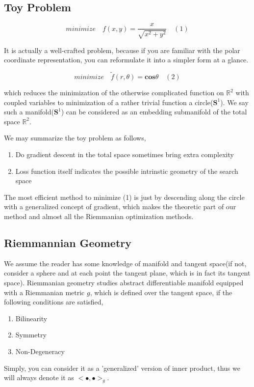 \documentclass[letterpaper]{article}
\begin{document}
\subsection{Toy Problem}
$$
  minimize \quad f(x,y) = \frac{x}{\sqrt{x^2+y^2}} \quad (1)
$$

It is actually a well-crafted problem, because if you are familiar with the polar coordinate representation, you can reformulate
it into a simpler form at a glance.

$$
  minimize \quad \tilde{f}(r,\theta)=\mathbf{cos}\theta \quad (2)
$$

which reduces the minimization of the otherwise complicated function on $\mathbb{R}^2$ with coupled variables to minimization of a rather trivial
function a circle($\mathbf{S}^1$). We say such a manifold($\mathbf{S}^1$) can be considered as an embedding submanifold of
the total space $\mathbb{R}^2$.

We may summarize the toy problem as follows,
\begin{enumerate}
  \item Do gradient descent in the total space sometimes bring extra complexity
  \item Loss function itself indicates the possible intrinstic geometry of the search space
\end{enumerate}

The most efficient method to minimize (1) is just by descending along the circle with a generalized concept of gradient, which makes the theoretic part of our method and almost all the Riemmanian
optimization methods.

\subsection{Riemmannian Geometry}
We assume the reader has some knowledge of manifold and tangent space(if not, consider a sphere and at each point the tangent plane, which is in fact its tangent space). Riemmanian geometry studies abstract differentiable manifold equipped with a Riemmanian metric $g$, which is defined over the
tangent space, if the following conditions are satisfied,
\begin{enumerate}
  \item Bilinearity
  \item Symmetry
  \item Non-Degeneracy
\end{enumerate}

Simply, you can consider it as a 'generalized' version of inner product, thus we will always denote it as $<\bullet,\bullet>_g$.
\end{document}
